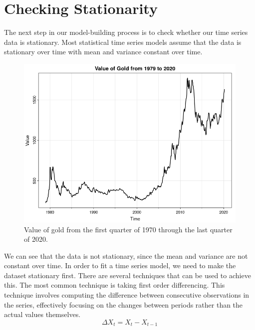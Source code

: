 \documentclass[12pt]{article}
\begin{document}
\section{Checking Stationarity}
The next step in our model-building process is to check whether our time series data is stationary. Most statistical time series models assume that the data is stationary over time with mean and variance constant over time.

\begin{figure}[h]
    \centering
    \includegraphics[width=1\textwidth]{images/data_plot.png}
    \caption{Value of gold from the first quarter of 1970 through the last quarter of 2020.}
    \label{fig:figure_1}
\end{figure}

We can see that the data is not stationary, since the mean and variance are not constant over time. In order to fit a time series model, we need to make the dataset stationary first. There are several techniques that can be used to achieve this. The most common technique is taking first order differencing. This technique involves computing the difference between consecutive observations in the series, effectively focusing on the changes between periods rather than the actual values themselves.
$$\Delta X_t = X_t - X_{t-1}$$
\end{document}
